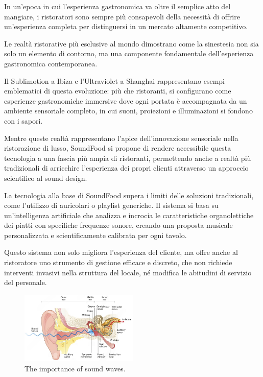 In un'epoca in cui l'esperienza gastronomica va oltre il semplice atto del mangiare, i ristoratori sono sempre più consapevoli della necessità di offrire un'esperienza completa per distinguersi in un mercato altamente competitivo.

Le realtà ristorative più esclusive al mondo dimostrano come la sinestesia non sia solo un elemento di contorno, ma una componente fondamentale dell'esperienza gastronomica contemporanea.

Il Sublimotion a Ibiza e l'Ultraviolet a Shanghai rappresentano esempi emblematici di questa evoluzione: più che ristoranti, si configurano come esperienze gastronomiche immersive dove ogni portata è accompagnata da un ambiente sensoriale completo, in cui suoni, proiezioni e illuminazioni si fondono con i sapori.

Mentre queste realtà rappresentano l'apice dell'innovazione sensoriale nella ristorazione di lusso, SoundFood si propone di rendere accessibile questa tecnologia a una fascia più ampia di ristoranti, permettendo anche a realtà più tradizionali di arricchire l'esperienza dei propri clienti attraverso un approccio scientifico al sound design.

La tecnologia alla base di SoundFood supera i limiti delle soluzioni tradizionali, come l'utilizzo di auricolari o playlist generiche. Il sistema si basa su un'intelligenza artificiale che analizza e incrocia le caratteristiche organolettiche dei piatti con specifiche frequenze sonore, creando una proposta musicale personalizzata e scientificamente calibrata per ogni tavolo.

Questo sistema non solo migliora l'esperienza del cliente, ma offre anche al ristoratore uno strumento di gestione efficace e discreto, che non richiede interventi invasivi nella struttura del locale, né modifica le abitudini di servizio del personale.

\begin{figure}[H]
    \centering
    \includegraphics[width=0.5\textwidth]{Chapters/Figures/sound_waves.png}
    \caption{\small The importance of sound waves.}
    \label{fig:sound_waves}
\end{figure}